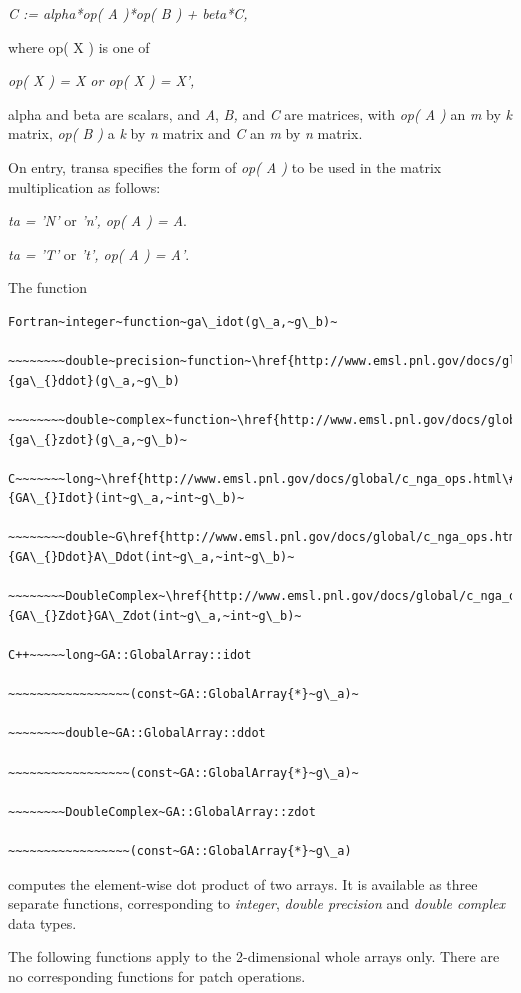 \emph{C := alpha{*}op( A ){*}op( B ) + beta{*}C,}

where op( X ) is one of

\emph{op( X ) = X or op( X ) = X',}

alpha and beta are scalars, and \emph{A}, \emph{B,} and \emph{C} are
matrices, with \emph{op( A ) }an \emph{m} by \emph{k} matrix, \emph{op(
B )} a \emph{k} by \emph{n} matrix and \emph{C} an \emph{m} by \emph{n}
matrix.

On entry, transa specifies the form of \emph{op( A )} to be used in
the matrix multiplication as follows: 

\emph{ta = 'N'} or\emph{ 'n', op( A ) = A}. 

\emph{ta = 'T'} or \emph{'t', op( A ) = A'}.

The function
\begin{verbatim}
Fortran~integer~function~ga\_idot(g\_a,~g\_b)~

~~~~~~~~double~precision~function~\href{http://www.emsl.pnl.gov/docs/global/ga_ops.html\#ga_ddot}{ga\_{}ddot}(g\_a,~g\_b)

~~~~~~~~double~complex~function~\href{http://www.emsl.pnl.gov/docs/global/ga_ops.html\#ga_zdot}{ga\_{}zdot}(g\_a,~g\_b)~

C~~~~~~~long~\href{http://www.emsl.pnl.gov/docs/global/c_nga_ops.html\#ga_dot}{GA\_{}Idot}(int~g\_a,~int~g\_b)~

~~~~~~~~double~G\href{http://www.emsl.pnl.gov/docs/global/c_nga_ops.html\#ga_dot}{GA\_{}Ddot}A\_Ddot(int~g\_a,~int~g\_b)~

~~~~~~~~DoubleComplex~\href{http://www.emsl.pnl.gov/docs/global/c_nga_ops.html\#ga_dot}{GA\_{}Zdot}GA\_Zdot(int~g\_a,~int~g\_b)~

C++~~~~~long~GA::GlobalArray::idot

~~~~~~~~~~~~~~~~~(const~GA::GlobalArray{*}~g\_a)~

~~~~~~~~double~GA::GlobalArray::ddot

~~~~~~~~~~~~~~~~~(const~GA::GlobalArray{*}~g\_a)~

~~~~~~~~DoubleComplex~GA::GlobalArray::zdot

~~~~~~~~~~~~~~~~~(const~GA::GlobalArray{*}~g\_a)
\end{verbatim}
computes the element-wise dot product of two arrays. It is available
as three separate functions, corresponding to \emph{integer}, \emph{double
precision} and \emph{double complex} data types.

The following functions apply to the 2-dimensional whole arrays only.
There are no corresponding functions for patch operations.

